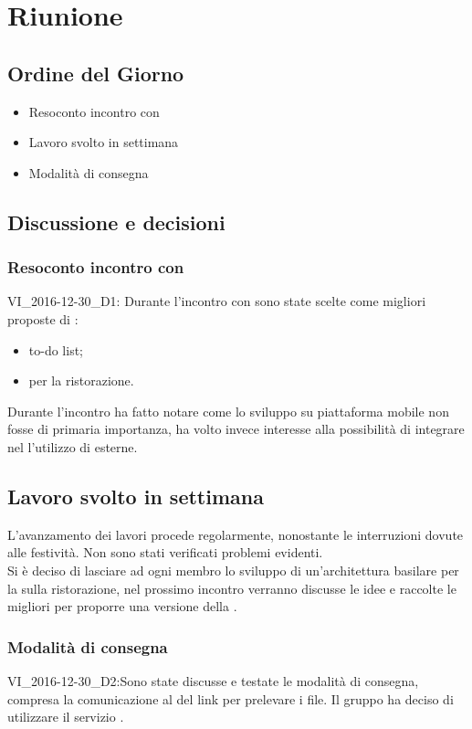 
\section{Riunione}
\subsection{Ordine del Giorno}
\begin{itemize}
	\item Resoconto incontro con \Proponente{}
	\item Lavoro svolto in settimana 
	\item Modalità di consegna
\end{itemize}

\subsection{Discussione e decisioni}
\subsubsection{Resoconto incontro con \Proponente{}}
VI\_2016-12-30\_D1: Durante l'incontro con \Proponente{} sono state scelte come migliori proposte di :
\begin{itemize}
	\item to-do list;
	\item {} per la ristorazione.
\end{itemize}
Durante l'incontro \Proponente{} ha fatto notare come lo sviluppo su piattaforma mobile non fosse di primaria importanza, ha volto invece interesse alla possibilità di integrare nel  l'utilizzo di  esterne.

\subsection{Lavoro svolto in settimana}
L'avanzamento dei lavori procede regolarmente, nonostante le interruzioni dovute alle festività. Non sono stati verificati problemi evidenti.\\
Si è deciso di lasciare ad ogni membro lo sviluppo di un'architettura basilare per la  sulla ristorazione, nel prossimo incontro verranno discusse le idee e raccolte le migliori per proporre una versione della .

\subsubsection{Modalità di consegna}
VI\_2016-12-30\_D2:Sono state discusse e testate le modalità di consegna, compresa la comunicazione al \Committente{} del link per prelevare i file. Il gruppo ha deciso di utilizzare il servizio . 

\clearpage

